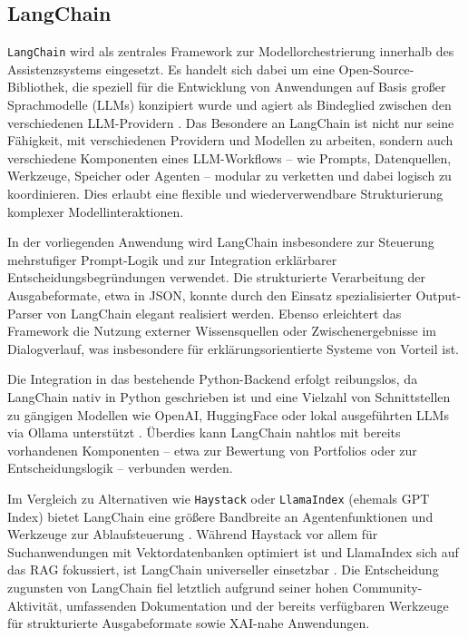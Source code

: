    \subsection{LangChain}

      \texttt{LangChain} wird als zentrales Framework zur Modellorchestrierung innerhalb des Assistenzsystems eingesetzt.
      Es handelt sich dabei um eine Open-Source-Bibliothek, die speziell für die Entwicklung von Anwendungen auf Basis großer Sprachmodelle (\acs{LLM}s) konzipiert wurde und agiert als Bindeglied zwischen den verschiedenen \acs{LLM}-Providern \autocite{langchain_docs}.
      Das Besondere an LangChain ist nicht nur seine Fähigkeit, mit verschiedenen Providern und Modellen zu arbeiten, sondern auch verschiedene Komponenten eines \acs{LLM}-Workflows -- wie Prompts, Datenquellen, Werkzeuge, Speicher oder Agenten -- modular zu verketten und dabei logisch zu koordinieren.
      Dies erlaubt eine flexible und wiederverwendbare Strukturierung komplexer Modellinteraktionen.

      In der vorliegenden Anwendung wird LangChain insbesondere zur Steuerung mehrstufiger Prompt-Logik und zur Integration erklärbarer Entscheidungsbegründungen verwendet.
      Die strukturierte Verarbeitung der Ausgabeformate, etwa in \acs{JSON}, konnte durch den Einsatz spezialisierter Output-Parser von LangChain elegant realisiert werden.
      Ebenso erleichtert das Framework die Nutzung externer Wissensquellen oder Zwischenergebnisse im Dialogverlauf, was insbesondere für erklärungsorientierte Systeme von Vorteil ist.

      Die Integration in das bestehende Python-Backend erfolgt reibungslos, da LangChain nativ in Python geschrieben ist und eine Vielzahl von Schnittstellen zu gängigen Modellen wie OpenAI, HuggingFace oder lokal ausgeführten \acs{LLM}s via Ollama unterstützt \autocite{langchain_docs}.
      Überdies kann LangChain nahtlos mit bereits vorhandenen Komponenten -- etwa zur Bewertung von Portfolios oder zur Entscheidungslogik -- verbunden werden.

      Im Vergleich zu Alternativen wie \texttt{Haystack} oder \texttt{LlamaIndex} (ehemals GPT Index) bietet LangChain eine größere Bandbreite an Agentenfunktionen und Werkzeuge zur Ablaufsteuerung \autocite{langchain_docs}.
      Während Haystack vor allem für Suchanwendungen mit Vektordatenbanken optimiert ist und LlamaIndex sich auf das \acs{RAG} fokussiert, ist LangChain universeller einsetzbar \autocite{heyamit_llamaindex_vs_langchain_vs_haystack_2025}.
      Die Entscheidung zugunsten von LangChain fiel letztlich aufgrund seiner hohen Community-Aktivität, umfassenden Dokumentation und der bereits verfügbaren Werkzeuge für strukturierte Ausgabeformate sowie XAI-nahe Anwendungen.

